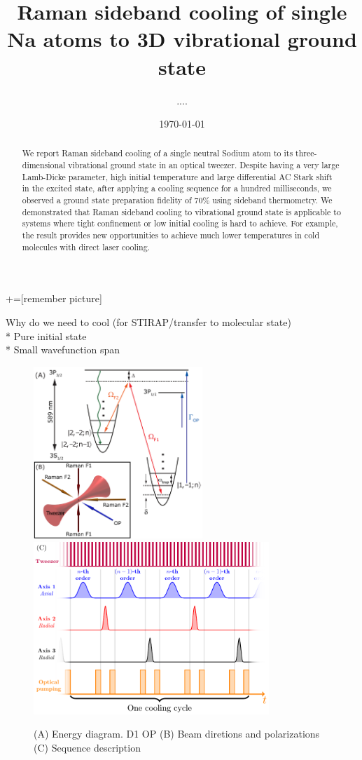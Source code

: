 \documentclass[aps,prl,twocolumn,groupedaddress]{revtex4-1}
\begin{document}
+=[remember picture]
\title{Raman sideband cooling of single Na atoms to 3D vibrational ground state}
\author{....}
\date{\today}

\begin{abstract}
  We report Raman sideband cooling of a single neutral Sodium atom to its three-dimensional
  vibrational ground state in an optical tweezer.
  Despite having a very large Lamb-Dicke parameter, high initial temperature and
  large differential AC Stark shift in the excited state,
  after applying a cooling sequence for a hundred milliseconds,
  we observed a ground state preparation fidelity of $70\%$ using sideband thermometry.
  We demonstrated that Raman sideband cooling to vibrational ground state is applicable to
  systems where tight confinement or low initial cooling is hard to achieve.
  For example, the result provides new opportunities to achieve much lower temperatures
  in cold molecules with direct laser cooling.
\end{abstract}

\maketitle

Why do we need to cool (for STIRAP/transfer to molecular state)\\

* Pure initial state\\
* Small wavefunction span\\

\begin{figure}
  \includegraphics[height=6.5cm]{imgs/Na_RSC_schematic.pdf}
  \includegraphics[height=6.5cm]{sequence.pdf}
  \caption{(A) Energy diagram. D1 OP
    (B) Beam diretions and polarizations
    (C) Sequence description
    \label{f-setup}}
\end{figure}
\end{document}
